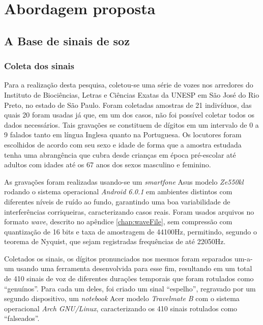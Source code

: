 \chapter{Abordagem proposta} \label{chap:propApproach}
	\section{A Base de sinais de soz}
	    \subsection{Coleta dos sinais}
		\par Para a realização desta pesquisa, coletou-se uma série de vozes nos arredores do Instituto de Biociências, Letras e Ciências Exatas da UNESP em São José do Rio Preto, no estado de São Paulo. Foram coletadas amostras de 21 indivíduos, das quais 20 foram usadas já que, em um dos casos, não foi possível coletar todos os dados necessários. Tais gravações se constituem de dígitos em um intervalo de 0 a 9 falados tanto em língua Inglesa quanto na Portuguesa. Os locutores foram escolhidos de acordo com seu sexo e idade de forma que a amostra estudada tenha uma abrangência que cubra desde crianças em época pré-escolar até adultos com idades até os 67 anos dos sexos masculino e feminino.\\
					
		\par As gravações foram realizadas usando-se um \textit{smartfone} Asus modelo \textit{Ze550kl} rodando o sistema operacional \textit{Android 6.0.1} em ambientes distintos com diferentes níveis de ruído ao fundo, garantindo uma boa variabilidade de interferências corriqueiras, caracterizando casos reais. Foram usados arquivos no formato \textit{wave}, descrito no apêndice \ref{chap:waveFile}, sem compressão com quantização de 16 bits e taxa de amostragem de 44100Hz, permitindo, segundo o teorema de Nyquist, que sejam registradas frequências de até 22050Hz.\\
		
		\par Coletados os sinais, os dígitos pronunciados nos mesmos foram separados um-a-um usando uma ferramenta desenvolvida para esse fim, resultando em um total de 410 sinais de voz de diferentes durações temporais que foram rotulados como ``genuínos''. Para cada um deles, foi criado um sinal ``espelho'',  regravado por um segundo dispositivo, um \textit{notebook} Acer modelo  \textit{Travelmate B} com o sistema operacional \textit{Arch GNU/Linux}, caracterizando os 410 sinais rotulados como ``falseados''.

